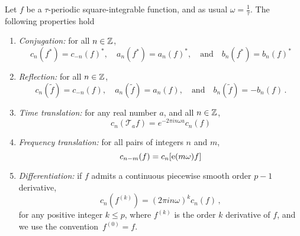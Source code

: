 \begin{proposition}
  \label{prop:fourier-coef-trans}
  Let $f$ be a $\tau$-periodic square-integrable function, and as usual
  $\omega=\frac{1}{\tau}$. The following properties hold
  \begin{enumerate}
    \item \emph{Conjugation:} for all $n\in\mathbb{Z}$,
      \begin{equation}
        c_n(f^*)=c_{-n}(f)^*,\quad a_n(f^*)=a_n(f)^*,\quad\text{and}\quad
        b_n(f^*)=b_n(f)^*
      \end{equation}
    \item \emph{Reflection:} for all $n\in\mathbb{Z}$,
      \begin{equation}
        c_n(\tilde{f})=c_{-n}(f),\quad a_n(\tilde{f})=a_n(f),\quad\text{and}\quad
        b_n(\tilde{f})=-b_n(f)\,.
      \end{equation}
    \item \emph{Time translation:} for any real number $a$, and all $n\in\mathbb{Z}$,
      \begin{equation}
        c_n(\mathcal{T}_af)=e^{-2\pi i n\omega a}c_n(f)\label{eq:cn-timetrans}
      \end{equation}
    \item \emph{Frequency translation:} for all pairs of integers $n$ and $m$,
      \begin{equation}
        c_{n-m}(f)=c_{n}[\operatorname{e}(m\omega)f]
      \end{equation}
    \item \emph{Differentiation:} if $f$ admits a continuous piecewise smooth order $p-1$
      derivative,
      \begin{equation}
        c_n(f^{(k)})=(2\pi i n\omega)^kc_n(f)\,,\label{eq:cn-der}
      \end{equation}
      for any positive integer $k\leq p$, where $f^{(k)}$ is the order $k$ derivative of
      $f$, and we use the convention~$f^{(0)}=f$.
  \end{enumerate}
\end{proposition}
